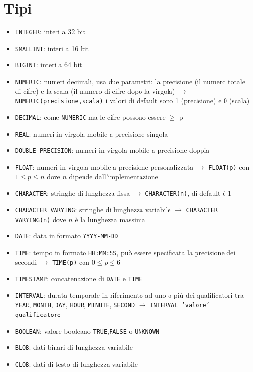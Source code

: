\documentclass[12pt, a4paper]{report}
\begin{document}
    \section{Tipi}
    \begin{itemize}
        \item \texttt{INTEGER}: interi a 32 bit
        \item \texttt{SMALLINT}: interi a 16 bit
        \item \texttt{BIGINT}: interi a 64 bit
        \item \texttt{NUMERIC}: numeri decimali, usa due parametri: la precisione (il numero totale di cifre) e la scala (il numero di cifre dopo la virgola) $\rightarrow$ \texttt{NUMERIC(precisione,scala)} i valori di default sono 1 (precisione) e 0 (scala)
        \item \texttt{DECIMAL}: come \texttt{NUMERIC} ma le cifre possono essere $\geq$ p
        \item \texttt{REAL}: numeri in virgola mobile a precisione singola
        \item \texttt{DOUBLE PRECISION}: numeri in virgola mobile a precisione doppia
        \item \texttt{FLOAT}: numeri in virgola mobile a precisione personalizzata $\rightarrow$ \texttt{FLOAT(p)} con $1\leq p \leq n$ dove $n$ dipende dall'implementazione
        \item \texttt{CHARACTER}: stringhe di lunghezza fissa $\rightarrow$ \texttt{CHARACTER(n)}, di default è 1
        \item \texttt{CHARACTER VARYING}: stringhe di lunghezza variabile $\rightarrow$ \texttt{CHARACTER VARYING(n)} dove $n$ è la lunghezza massima
        \item \texttt{DATE}: data in formato \texttt{YYYY-MM-DD}
        \item \texttt{TIME}: tempo in formato \texttt{HH:MM:SS}, può essere specificata la precisione dei secondi $\rightarrow$ \texttt{TIME(p)} con $0\leq p \leq 6$
        \item \texttt{TIMESTAMP}: concatenazione di \texttt{DATE} e \texttt{TIME}
        \item \texttt{INTERVAL}: durata temporale in riferimento ad uno o più dei qualificatori tra \texttt{YEAR}, \texttt{MONTH}, \texttt{DAY}, \texttt{HOUR}, \texttt{MINUTE}, \texttt{SECOND} $\rightarrow$ \texttt{INTERVAL 'valore' qualificatore}
        \item \texttt{BOOLEAN}: valore booleano \texttt{TRUE},\texttt{FALSE} o \texttt{UNKNOWN}
        \item \texttt{BLOB}: dati binari di lunghezza variabile
        \item \texttt{CLOB}: dati di testo di lunghezza variabile
    \end{itemize}
\end{document}

